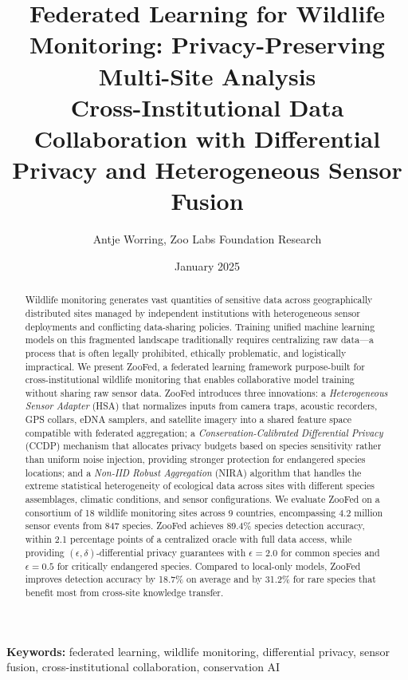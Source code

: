 \documentclass[11pt,a4paper]{article}
\title{\textbf{Federated Learning for Wildlife Monitoring: Privacy-Preserving Multi-Site Analysis} \\[0.5em]
\large Cross-Institutional Data Collaboration with Differential Privacy and Heterogeneous Sensor Fusion}
\author[1]{Antje Worring, Zoo Labs Foundation Research}
\affil[1]{Antje Worring, Zoo Labs Foundation Research, Research Division \\ \texttt{research@zoo.ngo}}
\date{January 2025}
\begin{document}
\zoocoverpage

\begin{abstract}
\noindent
Wildlife monitoring generates vast quantities of sensitive data across geographically distributed sites managed by independent institutions with heterogeneous sensor deployments and conflicting data-sharing policies.
Training unified machine learning models on this fragmented landscape traditionally requires centralizing raw data---a process that is often legally prohibited, ethically problematic, and logistically impractical.
We present ZooFed, a federated learning framework purpose-built for cross-institutional wildlife monitoring that enables collaborative model training without sharing raw sensor data.
ZooFed introduces three innovations: a \emph{Heterogeneous Sensor Adapter} (HSA) that normalizes inputs from camera traps, acoustic recorders, GPS collars, eDNA samplers, and satellite imagery into a shared feature space compatible with federated aggregation; a \emph{Conservation-Calibrated Differential Privacy} (CCDP) mechanism that allocates privacy budgets based on species sensitivity rather than uniform noise injection, providing stronger protection for endangered species locations; and a \emph{Non-IID Robust Aggregation} (NIRA) algorithm that handles the extreme statistical heterogeneity of ecological data across sites with different species assemblages, climatic conditions, and sensor configurations.
We evaluate ZooFed on a consortium of 18 wildlife monitoring sites across 9 countries, encompassing 4.2 million sensor events from 847 species.
ZooFed achieves 89.4\% species detection accuracy, within 2.1 percentage points of a centralized oracle with full data access, while providing $(\epsilon, \delta)$-differential privacy guarantees with $\epsilon = 2.0$ for common species and $\epsilon = 0.5$ for critically endangered species.
Compared to local-only models, ZooFed improves detection accuracy by 18.7\% on average and by 31.2\% for rare species that benefit most from cross-site knowledge transfer.
\end{abstract}

\vspace{0.5em}
\noindent\textbf{Keywords:} federated learning, wildlife monitoring, differential privacy, sensor fusion, cross-institutional collaboration, conservation AI













\end{document}
